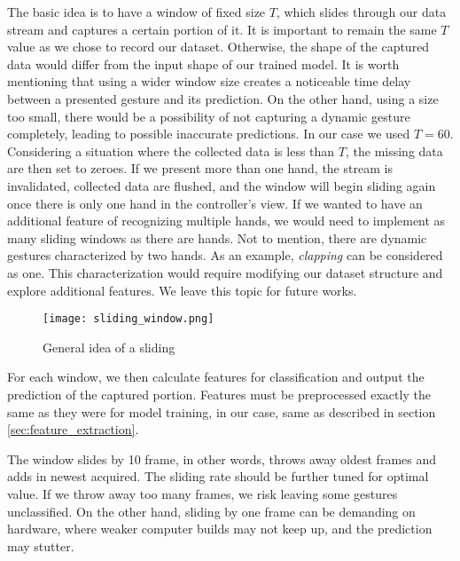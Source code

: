The basic idea is to have a window of fixed size $T$, which slides through our data stream and captures a certain portion of it. It is important to remain the same $T$ value as we chose to record our dataset. Otherwise, the shape of the captured data would differ from the input shape of our trained model. It is worth mentioning that using a wider window size creates a noticeable time delay between a presented gesture and its prediction. On the other hand, using a size too small, there would be a possibility of not capturing a dynamic gesture completely, leading to possible inaccurate predictions. In our case we used $T = 60$. Considering a situation where the collected data is less than $T$, the missing data are then set to zeroes. If we present more than one hand, the stream is invalidated, collected data are flushed, and the window will begin sliding again once there is only one hand in the controller's view. If we wanted to have an additional feature of recognizing multiple hands, we would need to implement as many sliding windows as there are hands. Not to mention, there are dynamic gestures characterized by two hands. As an example, \textit{clapping} can be considered as one.  This characterization would require modifying our dataset structure and explore additional features. We leave this topic for future works.


\begin{figure}[ht]
    \centering
    \texttt{[image: sliding\_window.png]}
    \caption{General idea of a sliding \cite{sliding_window_img}}
    \label{fig:sliding_window}
\end{figure}

For each window, we then calculate features for classification and output the prediction of the captured portion. Features must be preprocessed exactly the same as they were for model training, in our case, same as described in section \ref{sec:feature_extraction}. 

The window slides by 10 frame, in other words, throws away oldest frames and adds in newest acquired. The sliding rate should be further tuned for optimal value. If we throw away too many frames, we risk leaving some gestures unclassified. On the other hand, sliding by one frame can be demanding on hardware, where weaker computer builds may not keep up, and the prediction may stutter.

